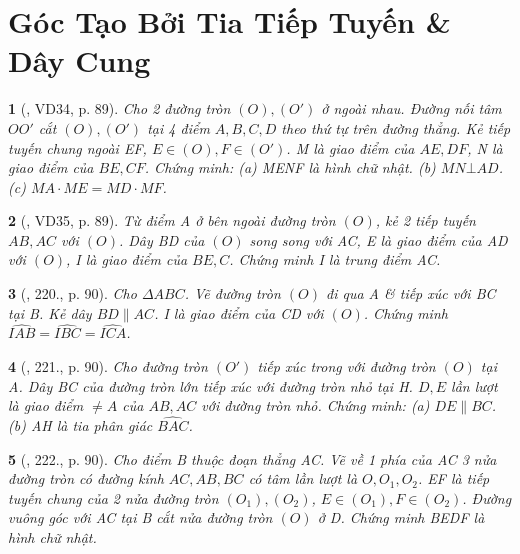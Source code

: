 \documentclass{article}
\newtheorem{baitoan}{}
\begin{document}

\section{Góc Tạo Bởi Tia Tiếp Tuyến \& Dây Cung}

\begin{baitoan}[\cite{Binh_Toan_9_tap_2}, VD34, p. 89]
	Cho 2 đường tròn $(O),(O')$ ở ngoài nhau. Đường nối tâm $OO'$ cắt $(O),(O')$ tại 4 điểm $A,B,C,D$ theo thứ tự trên đường thẳng. Kẻ tiếp tuyến chung ngoài EF, $E\in(O),F\in(O')$. M là giao điểm của $AE,DF$, N là giao điểm của $BE,CF$. Chứng minh: (a) MENF là hình chữ nhật. (b) $MN\bot AD$. (c) $MA\cdot ME = MD\cdot MF$.
\end{baitoan}

\begin{baitoan}[\cite{Binh_Toan_9_tap_2}, VD35, p. 89]
	Từ điểm A ở bên ngoài đường tròn $(O)$, kẻ 2 tiếp tuyến $AB,AC$ với $(O)$. Dây BD của $(O)$ song song với AC, E là giao điểm của AD với $(O)$, I là giao điểm của $BE,C$. Chứng minh I là trung điểm AC.
\end{baitoan}

\begin{baitoan}[\cite{Binh_Toan_9_tap_2}, 220., p. 90]
	Cho $\Delta ABC$. Vẽ đường tròn $(O)$ đi qua A \& tiếp xúc với BC tại B. Kẻ dây $BD\parallel AC$. I là giao điểm của CD với $(O)$. Chứng minh $\widehat{IAB} = \widehat{IBC} = \widehat{ICA}$.
\end{baitoan}

\begin{baitoan}[\cite{Binh_Toan_9_tap_2}, 221., p. 90]
	Cho đường tròn $(O')$ tiếp xúc trong với đường tròn $(O)$ tại A. Dây BC của đường tròn lớn tiếp xúc với đường tròn nhỏ tại H. $D,E$ lần lượt là giao điểm $\ne A$ của $AB,AC$ với đường tròn nhỏ. Chứng minh: (a) $DE\parallel BC$. (b) AH là tia phân giác $\widehat{BAC}$.
\end{baitoan}

\begin{baitoan}[\cite{Binh_Toan_9_tap_2}, 222., p. 90]
	Cho điểm B thuộc đoạn thẳng AC. Vẽ về 1 phía của AC 3 nửa đường tròn có đường kính $AC,AB,BC$ có tâm lần lượt là $O,O_1,O_2$. EF là tiếp tuyến chung của 2 nửa đường tròn $(O_1),(O_2)$, $E\in(O_1),F\in(O_2)$. Đường vuông góc với AC tại B cắt nửa đường tròn $(O)$ ở D. Chứng minh BEDF là hình chữ nhật.
\end{baitoan}
\end{document}
